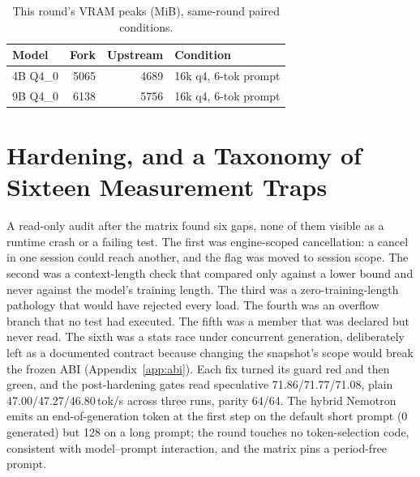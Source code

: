 \documentclass[letterpaper,twocolumn,10pt]{article}
\begin{document}
\begin{table}[t]
\centering
\small
\setlength{\tabcolsep}{3pt}
\begin{tabular}{@{}lrrl@{}}
\toprule
Model & Fork & Upstream & Condition \\
\midrule
4B Q4\_0 & 5065 & 4689 & 16k q4, 6-tok prompt \\
9B Q4\_0 & 6138 & 5756 & 16k q4, 6-tok prompt \\
\bottomrule
\end{tabular}
\caption{This round's VRAM peaks (MiB), same-round paired conditions.}
\label{tab:vram}
\end{table}

\section{Hardening, and a Taxonomy of Sixteen Measurement Traps}

A read-only audit after the matrix found six gaps, none of them visible as a
runtime crash or a failing test. The first was engine-scoped cancellation: a
cancel in one session could reach another, and the flag was moved to session
scope. The second was a context-length check that compared only against a lower
bound and never against the model's training length. The third was a
zero-training-length pathology that would have rejected every load. The fourth
was an overflow branch that no test had executed. The fifth was a member that
was declared but never read. The sixth was a stats race under concurrent
generation, deliberately left as a documented contract because changing the
snapshot's scope would break the frozen ABI (Appendix~\ref{app:abi}). Each fix
turned its guard red and then green, and the post-hardening gates read
speculative
71.86/71.77/71.08, plain 47.00/47.27/46.80\,tok/s across three runs, parity
64/64. The hybrid Nemotron emits an end-of-generation token at the first step on
the default short prompt (0 generated) but 128 on a long prompt; the round
touches no token-selection code, consistent with model--prompt interaction, and
the matrix pins a period-free prompt.
\end{document}
